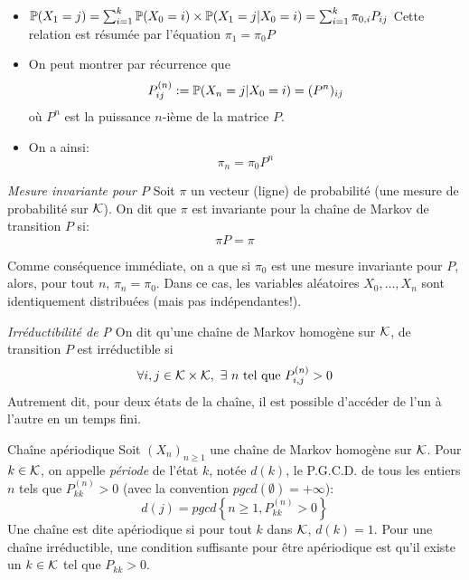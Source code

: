 \begin{itemize}
\item $\mathbb{P}(X_1 = j) = \sum_{i = 1}^k \mathbb{P}(X_0 = i) \times \mathbb{P}(X_1 = j \vert X_0 = i) = \sum_{i = 1}^k \pi_{0,i}P_{ij}$ 
Cette relation est résumée par l'équation $\pi_1 = \pi_0P$
\item On peut montrer par récurrence que 
$$P^{(n)}_{ij} := \mathbb{P}(X_n = j\vert X_0 = i) = (P^n)_{ij}$$ où $P^n$ est la puissance $n$-ième de la matrice $P$. 
\item On a ainsi: $$\pi_n = \pi_0P^n$$
\end{itemize}

\begin{definition}{\textit{Mesure invariante pour $P$}}
Soit $\pi$ un vecteur (ligne) de probabilité (une mesure de probabilité sur $\mathcal{K}$). On dit que $\pi$ est invariante pour la chaîne de Markov de transition $P$ si:
$$\pi P = \pi$$ 
\end{definition}

Comme conséquence immédiate, on a que si $\pi_0$ est une mesure invariante pour $P$, alors, pour tout $n$, $\pi_n = \pi_0$. Dans ce cas, les variables aléatoires $X_0,\dots, X_n$ sont identiquement distribuées (mais pas indépendantes!).

\begin{definition}{\textit{Irréductibilité de P}}
On dit qu'une chaîne de Markov homogène sur $\mathcal{K}$, de transition $P$ est irréductible si 
$$\forall i,j \in \mathcal{K}\times \mathcal{K},~\exists~n \text{ tel que } P^{(n)}_{i,j} > 0$$
Autrement dit, pour deux états de la chaîne, il est possible d'accéder de l'un à l'autre en un temps fini. 
\end{definition}

\begin{definition}{Chaîne apériodique}
Soit $(X_n)_{n\geq 1}$ une chaîne de Markov homogène sur $\mathcal{K}$. Pour $k \in \mathcal{K}$, on appelle \textit{période} de l'état $k$, notée $d(k)$, le P.G.C.D. de tous les entiers $n$ tels que $P^{(n)}_{kk} > 0$ (avec la convention $pgcd(\emptyset) = +\infty$):
$$d(j) = pgcd\left\lbrace n\geq 1, P^{(n)}_{kk} > 0\right\rbrace$$
Une chaîne est dite apériodique si pour tout $k$ dans $\mathcal{K}$, $d(k) = 1$.
Pour une chaîne irréductible, une condition suffisante pour être apériodique est qu'il existe un $k\in \mathcal{K}$ tel que $P_{kk} > 0$.
\end{definition}

